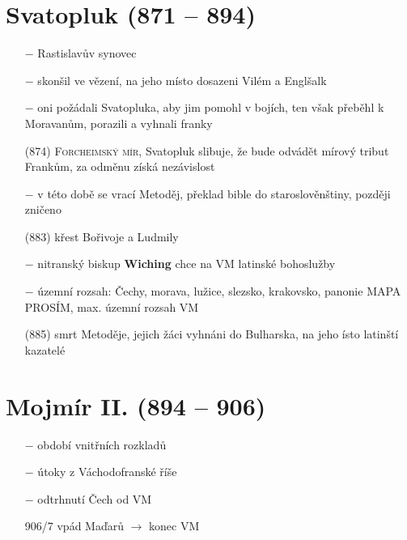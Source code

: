 \documentclass{article}
\begin{document}
\section*{Svatopluk (871 -- 894)}
\begin{itemize}
    \vspace{-0.5em}
    \setlength\itemsep{0.15em}
    \item[$-$] Rastislavův synovec
    \item[$-$] skonšil ve vězení, na jeho místo dosazeni Vilém a Englšalk
    \item[$-$] oni požádali Svatopluka, aby jim pomohl v bojích, ten však přeběhl k Moravanům, porazili a vyhnali franky
    \item[(874)] \textsc{Forcheimský mír}, Svatopluk slibuje, že bude odvádět mírový tribut Frankům, za odměnu získá nezávislost
    \item[$-$] v této době se vrací Metoděj, překlad bible do staroslověnštiny, později zničeno
    \item[(883)] křest Bořivoje a Ludmily
    \item[$-$] nitranský biskup \textbf{Wiching} chce na VM latinské bohoslužby
    \item[$-$] územní rozsah: Čechy, morava, lužice, slezsko, krakovsko, panonie MAPA PROSÍM, max. územní rozsah VM
    \item[(885)] smrt Metoděje, jejich žáci vyhnáni do Bulharska, na jeho ísto latinští kazatelé
\end{itemize}

\section*{Mojmír II. (894 -- 906)}
\begin{itemize}
    \vspace{-0.5em}
    \setlength\itemsep{0.15em}
    \item[$-$] období vnitřních rozkladů
    \item[$-$] útoky z Váchodofranské říše
    \item[$-$] odtrhnutí Čech od VM
    \item[906/7] vpád Maďarů $\rightarrow$ konec VM
\end{itemize}
\end{document}
